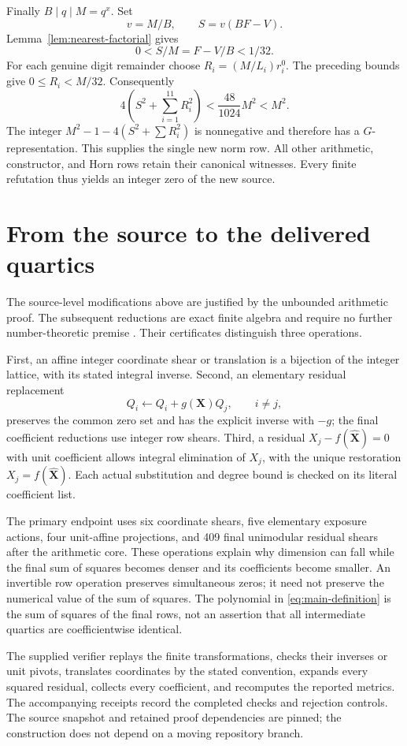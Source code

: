 \documentclass[11pt]{article}
\theoremstyle{definition}\newtheorem{definition}[theorem]{Definition}
\begin{document}
Finally \(B\mid q\mid M=q^x\). Set
\[
 v=M/B,\qquad S=v(BF-V).
\]
Lemma~\ref{lem:nearest-factorial} gives
\[
 0<S/M=F-V/B<1/32.
\]
For each genuine digit remainder choose
\(R_i=(M/L_i)r_i^0\). The preceding bounds give
\(0\le R_i<M/32\). Consequently
\[
 4\left(S^2+\sum_{i=1}^{11}R_i^2\right)
       <\frac{48}{1024}M^2<M^2.
\]
The integer
\(M^2-1-4(S^2+\sum R_i^2)\) is nonnegative and therefore
has a \(G\)-representation. This supplies the single new norm row.
All other arithmetic, constructor, and Horn rows retain their canonical
witnesses. Every finite refutation thus yields an integer zero of
the new source.

\section{From the source to the delivered quartics}

The source-level modifications above are justified by the unbounded
arithmetic proof. The subsequent reductions are exact finite algebra
and require no further number-theoretic premise \cite{residual}.
Their certificates distinguish three operations.

First, an affine integer coordinate shear or translation is a bijection
of the integer lattice, with its stated integral inverse.
Second, an elementary residual replacement
\[
 Q_i\longleftarrow Q_i+g(\mathbf X)Q_j,\qquad i\ne j,
\]
preserves the common zero set and has the explicit inverse with
\(-g\); the final coefficient reductions use integer row shears.
Third, a residual \(X_j-f(\widehat{\mathbf X})=0\) with unit
coefficient allows integral elimination of \(X_j\), with the unique
restoration \(X_j=f(\widehat{\mathbf X})\). Each actual substitution
and degree bound is checked on its literal coefficient list.

The primary endpoint uses six coordinate shears, five elementary
exposure actions, four unit-affine projections, and 409 final
unimodular residual shears after the arithmetic core.
These operations explain why dimension can fall while the final
sum of squares becomes denser and its coefficients become smaller.
An invertible row operation preserves simultaneous zeros; it need
not preserve the numerical value of the sum of squares.
The polynomial in \eqref{eq:main-definition} is the sum of squares
of the final rows, not an assertion that all intermediate quartics
are coefficientwise identical.

The supplied verifier replays the finite transformations, checks
their inverses or unit pivots, translates coordinates by the stated
convention, expands every squared residual, collects every
coefficient, and recomputes the reported metrics. The accompanying
receipts record the completed checks and rejection controls.
The source snapshot and retained proof dependencies are pinned;
the construction does not depend on a moving repository branch.
\end{document}
